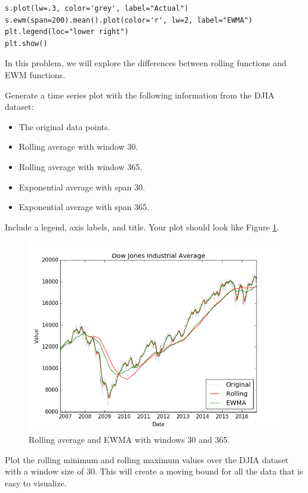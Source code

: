 \begin{lstlisting}
s.plot(lw=.3, color='grey', label="Actual")
s.ewm(span=200).mean().plot(color='r', lw=2, label="EWMA")
plt.legend(loc="lower right")
plt.show()
\end{lstlisting}

\begin{problem} \label{prob:averages}
In this problem, we will explore the differences between rolling functions and EWM functions.

Generate a time series plot with the following information from the DJIA dataset:
    \begin{itemize}
        \item The original data points.
        \item Rolling average with window 30.
        \item Rolling average with window 365.
        \item Exponential average with span 30.
        \item Exponential average with span 365.
    \end{itemize}
Include a legend, axis labels, and title. Your plot should look like Figure \ref{fig:averages}.
\end{problem}

\begin{figure} \label{fig:averages}
    \includegraphics[width=\textwidth]{dow_averages.png}
    \caption{Rolling average and EWMA with windows 30 and 365.}
\end{figure}

\begin{problem} \label{prob:rolling_bound}
Plot the rolling minimum and rolling maximum values over the DJIA dataset with a window size of 30. This will create a moving bound for all the data that is easy to visualize.
\end{problem}
